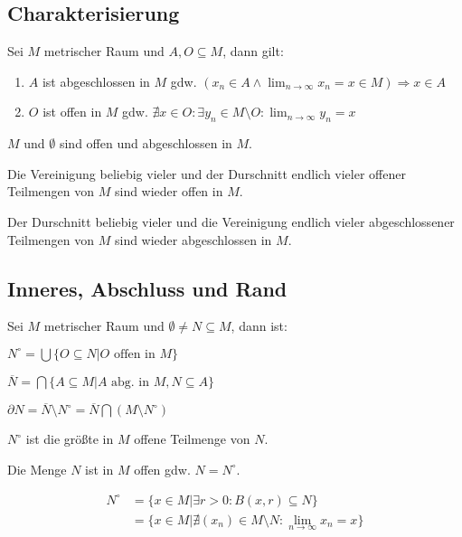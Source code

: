 \subsection*{Charakterisierung}

Sei $M$ metrischer Raum und $A, O \subseteq M$, dann gilt:

\begin{enumerate}[label=(\alph*)]
	\item $A$ ist abgeschlossen in $M$ gdw. $(x_n \in A \land \lim_{n \to \infty} x_n = x \in M ) \Rightarrow x \in A$
	\item $O$ ist offen in $M$ gdw. $\nexists x \in O : \exists y_n \in M \setminus O : \lim_{n \to \infty} y_n = x$
\end{enumerate}

$M$ und $\emptyset$ sind offen und abgeschlossen in $M$.

Die Vereinigung beliebig vieler und der Durschnitt endlich vieler offener Teilmengen von $M$ sind wieder offen in $M$.

Der Durschnitt beliebig vieler und die Vereinigung endlich vieler abgeschlossener Teilmengen von $M$ sind wieder abgeschlossen in $M$.

\subsection*{Inneres, Abschluss und Rand}

Sei $M$ metrischer Raum und $\emptyset \neq N \subseteq M$, dann ist:

\begin{description}[leftmargin=!,labelwidth=15mm]
	\item[Innere] $N^\circ = \bigcup \{ O \subseteq N | O \text{ offen in } M \}$
	\item[Abschluss] $\overline N = \bigcap\{A \subseteq M | A \text{ abg. in } M, N \subseteq A\}$
	\item[Rand] $\partial N = \overline N \setminus N^\circ = \overline N \bigcap (M \setminus N^\circ)$
\end{description}

$N^\circ$ ist die größte in $M$ offene Teilmenge von $N$.

Die Menge $N$ ist in $M$ offen gdw. $N = N^\circ$.

\vspace*{-6mm}
\begin{align*}
	N^\circ &= \{x \in M | \exists r > 0 : B(x, r) \subseteq N\} \\
	        &= \{x \in M | \nexists (x_n) \in M \setminus N : \displaystyle\lim_{n \to \infty} x_n = x\}
\end{align*}
\vspace*{-6mm}

